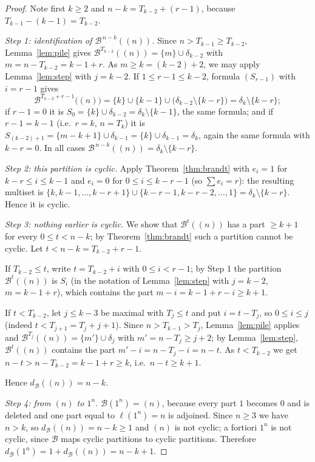 \documentclass[11pt]{article}
\theoremstyle{definition}
\newcommand{\B}{\mathcal{B}}
\newcommand{\dB}{d_{\mathcal{B}}}
\renewcommand{\le}{\leqslant}
\renewcommand{\ge}{\geqslant}
\begin{document}
\begin{proof}
Note first $k\ge2$ and $n-k=T_{k-2}+(r-1)$, because $T_{k-1}-(k-1)=T_{k-2}$.

\smallskip
\noindent\emph{Step 1: identification of $\B^{\,n-k}((n))$.}  Since $n>T_{k-1}\ge T_{k-2}$, Lemma~\ref{lem:pile}
gives $\B^{T_{k-2}}((n))=\{m\}\cup\delta_{k-2}$ with $m=n-T_{k-2}=k-1+r$.  As $m\ge k=(k-2)+2$, we may apply
Lemma~\ref{lem:step} with $j=k-2$.  If $1\le r-1\le k-2$, formula $(S_{r-1})$ with $i=r-1$ gives
\[
\B^{T_{k-2}+r-1}\bigl((n)\bigr)=\{k\}\cup\{k-1\}\cup\bigl(\delta_{k-2}\setminus\{k-r\}\bigr)=\delta_k\setminus\{k-r\};
\]
if $r-1=0$ it is $S_0=\{k\}\cup\delta_{k-2}=\delta_k\setminus\{k-1\}$, the same formula; and if $r-1=k-1$
(i.e.\ $r=k$, $n=T_k$) it is $S_{(k-2)+1}=\{m-k+1\}\cup\delta_{k-1}=\{k\}\cup\delta_{k-1}=\delta_k$, again the same
formula with $k-r=0$.  In all cases
$\B^{\,n-k}((n))=\delta_k\setminus\{k-r\}$.

\smallskip
\noindent\emph{Step 2: this partition is cyclic.}  Apply Theorem~\ref{thm:brandt} with
$e_i=1$ for $k-r\le i\le k-1$ and $e_i=0$ for $0\le i\le k-r-1$ (so $\sum e_i=r$): the resulting multiset is
$\{k,k-1,\dots,k-r+1\}\cup\{k-r-1,k-r-2,\dots,1\}=\delta_k\setminus\{k-r\}$.  Hence it is cyclic.

\smallskip
\noindent\emph{Step 3: nothing earlier is cyclic.}  We show that $\B^t((n))$ has a part $\ge k+1$ for every
$0\le t<n-k$; by Theorem~\ref{thm:brandt} such a partition cannot be cyclic.  Let $t<n-k=T_{k-2}+r-1$.

If $T_{k-2}\le t$, write $t=T_{k-2}+i$ with $0\le i<r-1$; by Step 1 the partition $\B^t((n))$ is
$S_i$ (in the notation of Lemma~\ref{lem:step} with $j=k-2$, $m=k-1+r$), which contains the part
$m-i=k-1+r-i\ge k+1$.

If $t<T_{k-2}$, let $j\le k-3$ be maximal with $T_j\le t$ and put $i=t-T_j$, so $0\le i\le j$ (indeed
$t<T_{j+1}=T_j+j+1$).  Since $n>T_{k-1}>T_{j}$, Lemma~\ref{lem:pile} applies and $\B^{T_j}((n))=\{m'\}\cup\delta_j$
with $m'=n-T_j\ge j+2$; by Lemma~\ref{lem:step}, $\B^t((n))$ contains the part $m'-i=n-T_j-i=n-t$.  As
$t<T_{k-2}$ we get $n-t>n-T_{k-2}=k-1+r\ge k$, i.e.\ $n-t\ge k+1$.

Hence $\dB((n))=n-k$.

\smallskip
\noindent\emph{Step 4: from $(n)$ to $1^n$.}  $\B(1^n)=(n)$, because every part $1$ becomes $0$ and is deleted and
one part equal to $\ell(1^n)=n$ is adjoined.  Since $n\ge3$ we have $n>k$, so $\dB((n))=n-k\ge1$ and $(n)$ is not
cyclic; a fortiori $1^n$ is not cyclic, since $\B$ maps cyclic partitions to cyclic partitions.  Therefore
$\dB(1^n)=1+\dB((n))=n-k+1$.
\end{proof}
\end{document}
